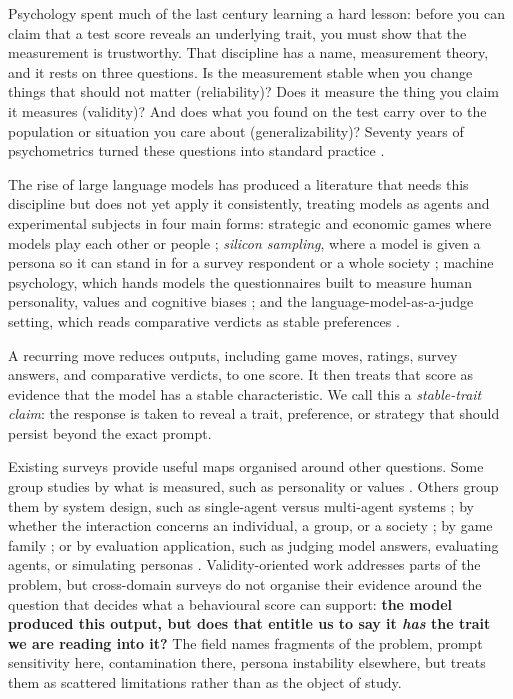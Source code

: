 \documentclass[11pt]{article}
\begin{document}
Psychology spent much of the last century learning a hard lesson: before you
can claim that a test score reveals an underlying trait, you must show that
the measurement is trustworthy. That discipline has a name, measurement
theory, and it rests on three questions. Is the measurement stable when you
change things that should not matter (reliability)? Does it measure the
thing you claim it measures (validity)? And does what you found on the test
carry over to the population or situation you care about (generalizability)?
Seventy years of psychometrics turned these questions into standard practice
\cite{cronbach1955construct,messick1995validity}.

The rise of large language models has produced a literature that needs this
discipline but does not yet apply it consistently, treating models as agents and
experimental subjects \cite{rahwan2019machine,hagendorff2023machine} in four main
forms: strategic and economic games where models play each other or people
\cite{akata2025playing,fontana2025nicer,bianchi2024negotiation}; \emph{silicon
sampling}, where a model is given a persona so it can stand in for a survey
respondent or a whole society
\cite{argyle2023out,santurkar2023whose,park2023generative}; machine psychology,
which hands models the questionnaires built to measure human personality, values
and cognitive biases
\cite{binz2023cognitive,echterhoff2024cognitive,ye2025psychometrics}; and the
language-model-as-a-judge setting, which reads comparative verdicts as stable
preferences \cite{zhengmt2023judging,gu2024judge}.

A recurring move reduces outputs, including game moves, ratings, survey
answers, and comparative verdicts, to one score. It then treats that score as
evidence that the model has a stable characteristic. We call this a
\emph{stable-trait claim}: the response is taken to reveal a trait, preference,
or strategy that should persist beyond the exact prompt.

Existing surveys provide useful maps organised around other questions. Some
group studies by what is measured, such as personality or values
\cite{hagendorff2023machine,ye2025psychometrics}. Others group them by system
design, such as single-agent versus multi-agent systems
\cite{xi2023rise,wanglei2024autonomous}; by whether the interaction concerns an
individual, a group, or a society \cite{mou2024individual}; by game family
\cite{sun2025gametheory}; or by evaluation application, such as judging model
answers, evaluating agents, or simulating personas
\cite{gu2024judge,yehudai2025evaluation,tseng2024persona}. Validity-oriented work
addresses parts of the problem, but cross-domain surveys do not organise their
evidence around the question that decides what a behavioural score can support:
\textbf{the model produced
this output, but does that entitle us to say it \emph{has} the trait we are
reading into it?} The field names fragments of the problem, prompt sensitivity
here, contamination there, persona instability elsewhere, but treats them as
scattered limitations rather than as the object of study.
\end{document}

